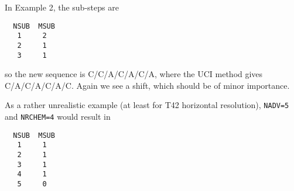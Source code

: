 In Example 2, the sub-steps are
\begin{verbatim}
  NSUB  MSUB
   1     2
   2     1
   3     1
\end{verbatim}
so the new sequence is C/C/A/C/A/C/A, where the UCI method gives
C/A/C/A/C/A/C. Again we see a shift, which should be of minor
importance.

As a rather unrealistic example (at least for T42 horizontal
resolution), \verb#NADV=5# and \verb#NRCHEM=4# would result in
\begin{verbatim}
  NSUB  MSUB
   1     1
   2     1
   3     1
   4     1
   5     0
\end{verbatim}
